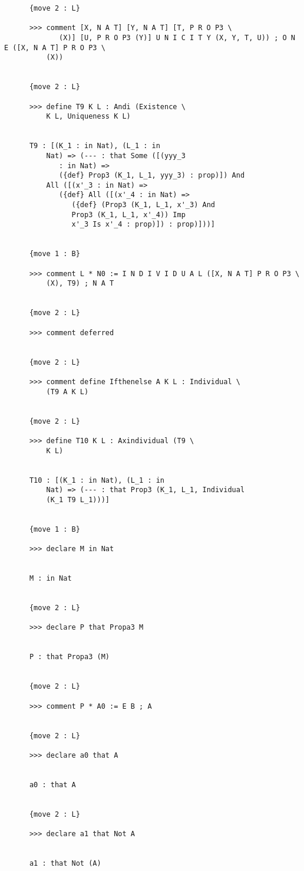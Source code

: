 \documentclass{article}
\begin{document}
\begin{verbatim}
      {move 2 : L}

      >>> comment [X, N A T] [Y, N A T] [T, P R O P3 \
             (X)] [U, P R O P3 (Y)] U N I C I T Y (X, Y, T, U)) ; O N E ([X, N A T] P R O P3 \
          (X))


      {move 2 : L}

      >>> define T9 K L : Andi (Existence \
          K L, Uniqueness K L)


      T9 : [(K_1 : in Nat), (L_1 : in 
          Nat) => (--- : that Some ([(yyy_3 
             : in Nat) => 
             ({def} Prop3 (K_1, L_1, yyy_3) : prop)]) And 
          All ([(x'_3 : in Nat) => 
             ({def} All ([(x'_4 : in Nat) => 
                ({def} (Prop3 (K_1, L_1, x'_3) And 
                Prop3 (K_1, L_1, x'_4)) Imp 
                x'_3 Is x'_4 : prop)]) : prop)]))]


      {move 1 : B}

      >>> comment L * N0 := I N D I V I D U A L ([X, N A T] P R O P3 \
          (X), T9) ; N A T


      {move 2 : L}

      >>> comment deferred


      {move 2 : L}

      >>> comment define Ifthenelse A K L : Individual \
          (T9 A K L)


      {move 2 : L}

      >>> define T10 K L : Axindividual (T9 \
          K L)


      T10 : [(K_1 : in Nat), (L_1 : in 
          Nat) => (--- : that Prop3 (K_1, L_1, Individual 
          (K_1 T9 L_1)))]


      {move 1 : B}

      >>> declare M in Nat


      M : in Nat


      {move 2 : L}

      >>> declare P that Propa3 M


      P : that Propa3 (M)


      {move 2 : L}

      >>> comment P * A0 := E B ; A


      {move 2 : L}

      >>> declare a0 that A


      a0 : that A


      {move 2 : L}

      >>> declare a1 that Not A


      a1 : that Not (A)



\end{verbatim}
\end{document}
